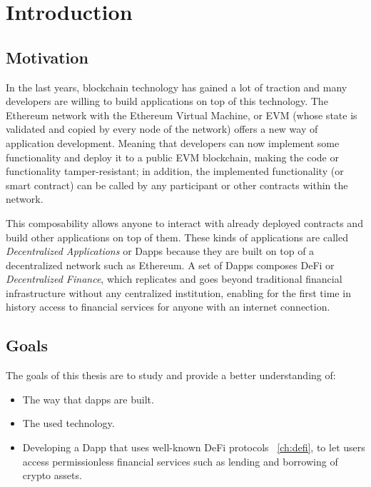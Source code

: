 \documentclass[11pt,a4paper]{report}
\begin{document}


\tableofcontents
\newpage 

\chapter{Introduction} \label{ch:intro}

\section{Motivation}
In the last years, blockchain technology has gained a lot of traction and many developers are willing to build applications on top of this technology.
The Ethereum network with the Ethereum Virtual Machine, or EVM (whose state is validated and copied by every node of the network) offers a new way of application development. Meaning that developers can now implement some functionality and deploy it to a public EVM blockchain, making the code or functionality tamper-resistant; in addition, the implemented functionality (or smart contract) can be called by any participant or other contracts within the network. 

This composability allows anyone to interact with already deployed contracts and build other applications on top of them. 
These kinds of applications are called \textit{Decentralized Applications} or Dapps because they are built on top of a decentralized network such as Ethereum. A set of Dapps composes DeFi or \textit{Decentralized Finance}, which replicates and goes beyond traditional financial infrastructure without any centralized institution, enabling for the first time in history access to financial services for anyone with an internet connection.
\section{Goals}
The goals of this thesis are to study and provide a better understanding of:
\begin{itemize}
	\item The way that dapps are built.
	\item The used technology.
	\item Developing a Dapp that uses well-known DeFi protocols ~\ref{ch:defi}, to let users access permissionless financial services such as lending and borrowing of crypto assets.
\end{itemize}
\end{document}
